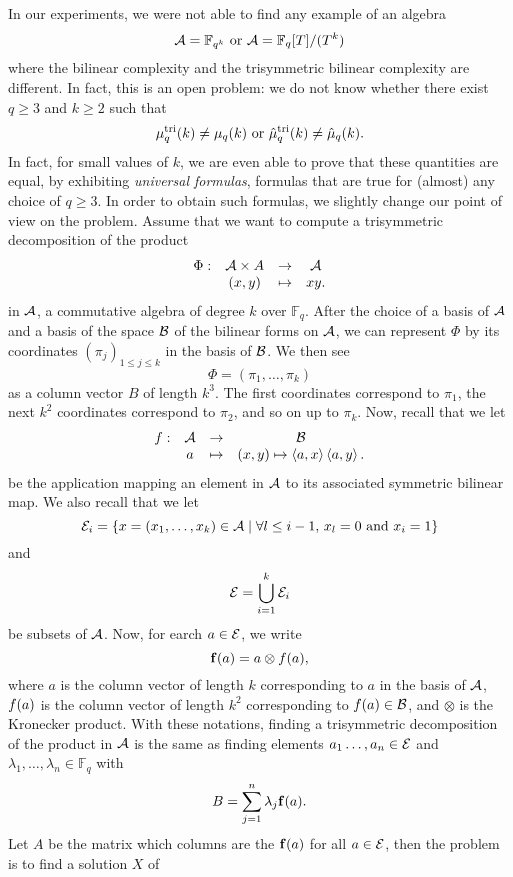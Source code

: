 In our experiments, we were not able to find any example of an algebra
\[
  \mathcal{A} = \mathbb{F}_{q^k}\text{ or } \mathcal{A} = \mathbb{F}_{q}[T]/(T^k)
\]
where the bilinear complexity and the trisymmetric bilinear complexity are
different. In fact, this is an open problem: we do not know whether there exist
$q\geq3$ and $k\geq 2$ such that 
\[
  \mu^{\textrm{tri}}_q(k)\neq\mu_q(k)\text{ or }\hat\mu^{\textrm{tri}}_q(k)\neq\hat\mu_q(k).
\]
In fact, for small values of $k$, we are even able to prove that these
quantities are equal, by exhibiting \emph{universal formulas}, \ie formulas that
are true for (almost) any choice of $q\geq3$. In order to obtain such formulas,
we slightly change our point of view on the problem. Assume that we want to
compute a trisymmetric decomposition of the product
\[
  \begin{array}{cccc}
    \Phi: & \mathcal{A}\times A & \to & \mathcal{A}\\
    & (x,y) & \mapsto & xy.
  \end{array}
\]
in $\mathcal{A}$, a commutative algebra of degree $k$ over $\mathbb{F}_q$. After the
choice of a basis of $\mathcal{A}$ and a basis of the space $\mathcal{B}$ of the bilinear forms on
$\mathcal{A}$, we can represent $\Phi$ by its coordinates $(\pi_j)_{1\leq j\leq k}$ in
the basis of $\mathcal{B}$. We then see
\[
  \Phi = (\pi_1, \dots, \pi_k)
\]
as a column vector $B$ of length $k^3$. The first coordinates correspond to
$\pi_1$, the next $k^2$ coordinates correspond to $\pi_2$, and so on up to
$\pi_k$. Now, recall that we let 
\[
  \begin{array}{cccc}
    f: & \mathcal{A} & \to & \mathcal{B}\\
    & a & \mapsto & (x, y)\mapsto\left\langle a,x\right\rangle\left\langle a,y\right\rangle.
  \end{array}
\]
be the application mapping an element in $\mathcal{A}$ to its associated symmetric
bilinear map. We also recall that we let 
\[
  \mathcal{E}_i=\left\{ x=(x_1, \dots, x_k)\in
    \mathcal{A}\mid \forall l\leq i-1,\,x_l=0\text{ and }x_i=1 \right\}
\]
and
\[
  \mathcal{E} = \bigcup_{i=1}^k\mathcal{E}_i
\]
be subsets of $\mathcal{A}$. Now, for earch $a\in \mathcal{E}$, we write 
\[
  \mathbf{f}(a) = a\otimes f(a),
\]
where $a$ is the column vector of length $k$ corresponding to $a$ in the basis
of $\mathcal{A}$, $f(a)$ is the column vector of length $k^2$ corresponding
to $f(a)\in\mathcal{B}$, and $\otimes$ is the Kronecker product. With these notations,
finding a trisymmetric decomposition of the product in
$\mathcal{A}$ is the same as finding elements $a_1\dots,
a_n\in\mathcal{E}$ and $\lambda_1, \dots, \lambda_n\in\mathbb{F}_q$ with
\[
  B = \sum_{j=1}^n \lambda_j\mathbf{f}(a).
\]
Let $A$ be the matrix which columns are the $\mathbf{f}(a)$ for all $a\in\mathcal{E}$, then the
problem is to find a solution $X$ of
